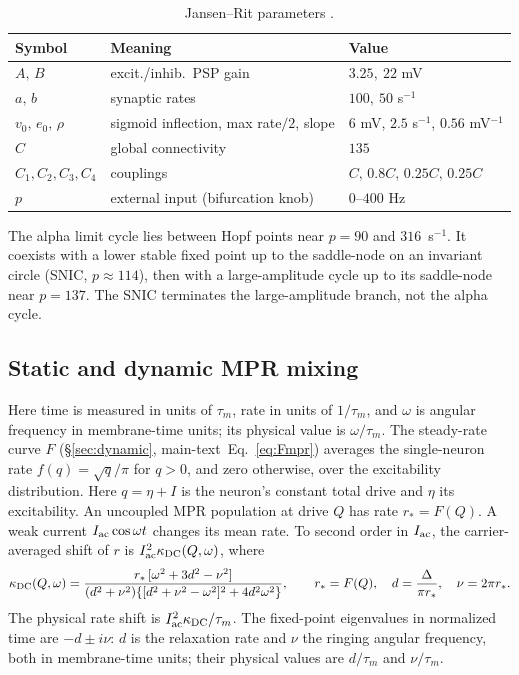 \begin{table}[h]\centering\small
\caption{Jansen--Rit parameters \cite{jansen1995}.}
\label{tab:params}
\begin{tabular}{@{}lll@{}}
\toprule
Symbol & Meaning & Value\\
\midrule
$A,\,B$ & excit./inhib.\ PSP gain & $3.25,\ 22$ mV\\
$a,\,b$ & synaptic rates & $100,\ 50$ s$^{-1}$\\
$v_0,\,e_0,\,\rho$ & sigmoid inflection, max rate$/2$, slope & $6$ mV, $2.5$ s$^{-1}$, $0.56$ mV$^{-1}$\\
$C$ & global connectivity & $135$\\
$C_1,C_2,C_3,C_4$ & couplings & $C,\,0.8C,\,0.25C,\,0.25C$\\
$p$ & external input (bifurcation knob) & $0$--$400$ Hz\\
\bottomrule
\end{tabular}
\end{table}

The alpha limit cycle lies between Hopf points near $p=90$ and
$316$~s$^{-1}$. It coexists with a lower stable fixed point up to the
saddle-node on an invariant circle (SNIC, $p\approx114$), then with a
large-amplitude cycle up to its saddle-node near $p=137$. The SNIC
terminates the large-amplitude branch, not the alpha cycle.




\subsection{Static and dynamic MPR mixing}\label{app:mpr-coefficients}\label{app:mpr-mixing}
Here time is measured in units of $\tau_m$, rate in units of $1/\tau_m$, and
$\omega$ is angular frequency in membrane-time units; its physical value is
$\omega/\tau_m$. The steady-rate curve $F$ (\S\ref{sec:dynamic},
\ifsupp main-text\fi\ Eq.~\eqref{eq:Fmpr}) averages the single-neuron rate
$f(q)=\sqrt q/\pi$ for $q>0$, and zero otherwise, over the excitability
distribution. Here $q=\eta+I$ is the neuron's constant total drive and $\eta$
its excitability. An uncoupled MPR population at drive $Q$ has rate $r_*=F(Q)$.
A weak current $I_{\rm ac}\cos\omega t$ changes its mean rate.
To second order in $I_{\rm ac}$, the carrier-averaged shift of $r$ is $I_{\rm ac}^2\kappa_{\rm DC}(Q,\omega)$, where
\begin{equation}
\kappa_{\rm DC}(Q,\omega)=\frac{r_*\,[\omega^2+3d^2-\nu^2]}{(d^2+\nu^2)\{[d^2+\nu^2-\omega^2]^2+4d^2\omega^2\}},
\qquad r_*=F(Q),\quad d=\frac{\Delta}{\pi r_*},\quad \nu=2\pi r_*.
\label{eq:crossover}
\end{equation}
The physical rate shift is $I_{\rm ac}^2\kappa_{\rm DC}/\tau_m$.
The fixed-point eigenvalues in normalized time are $-d\pm i\nu$: $d$ is the relaxation rate and $\nu$
the ringing angular frequency, both in membrane-time units; their physical
values are $d/\tau_m$ and $\nu/\tau_m$.

